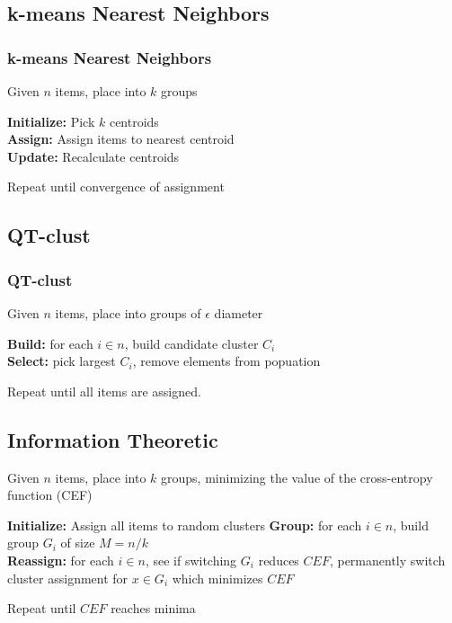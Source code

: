 \documentclass{beamer}
\begin{document}
\subsection{k-means Nearest Neighbors}
\begin{frame}
\frametitle{k-means Nearest Neighbors}
Given $n$ items, place into $k$ groups\\

\bigskip

\textbf{Initialize:} Pick $k$ centroids\\
\textbf{Assign:} Assign items to nearest centroid\\
\textbf{Update:} Recalculate centroids\\

\bigskip

Repeat until convergence of assignment

\end{frame}

\begin{frame}
\end{frame}


\subsection{QT-clust}
\begin{frame}
\frametitle{QT-clust}
Given $n$ items, place into groups of $\epsilon$ diameter\\

\bigskip

\textbf{Build:} for each $i \in n$, build candidate cluster $C_i$ \\
\textbf{Select:} pick largest $C_i$, remove elements from popuation \\

\bigskip

Repeat until all items are assigned.

\end{frame}


\subsection{Information Theoretic}
\begin{frame}
Given $n$ items, place into $k$ groups, minimizing the value of the cross-entropy function (CEF) \\

\bigskip

\textbf{Initialize:} Assign all items to random clusters
\textbf{Group:} for each $i \in n$, build group $G_i$ of size $M = n / k$ \\
\textbf{Reassign:} for each $i \in n$, see if switching $G_i$ reduces $CEF$, permanently switch cluster assignment for $x \in G_i$ which minimizes $CEF$ \\

\bigskip

Repeat until $CEF$ reaches minima
\end{frame}

\end{document}
